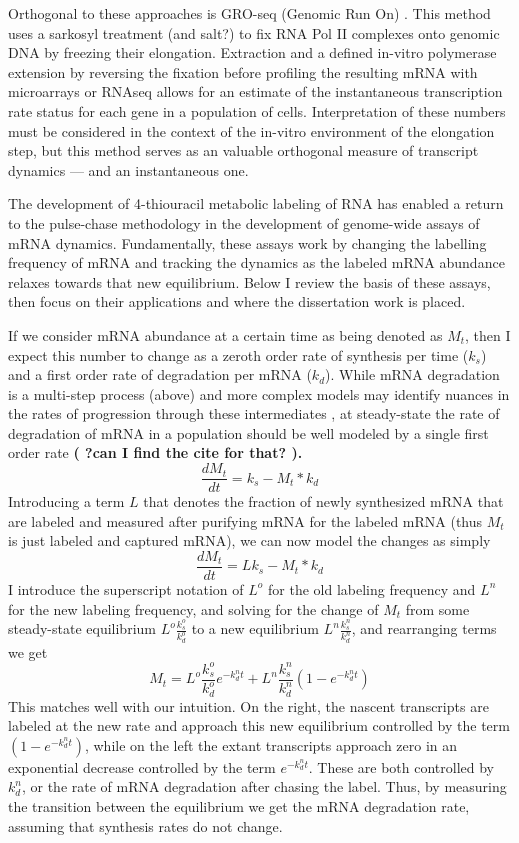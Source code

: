 Orthogonal to these approaches is GRO-seq
(Genomic Run On)
\parencite{garcia2004genomic}. This method uses a sarkosyl treatment (and
salt?) to fix RNA Pol II complexes onto genomic DNA by freezing
their elongation. Extraction and a defined in-vitro polymerase
extension by reversing the fixation before profiling the resulting
mRNA with microarrays or RNAseq allows for an estimate of the
instantaneous transcription rate status for each gene in a population
of cells. Interpretation of these numbers must be considered in the
context of the in-vitro environment of the elongation step, but this
method serves as an valuable orthogonal measure of transcript dynamics
--- and an instantaneous one.  

The development of 4-thiouracil
metabolic labeling of RNA 
\parencite{dolken2008high}
has enabled a return to
the pulse-chase methodology in the development of genome-wide assays
of mRNA dynamics. Fundamentally, these assays work by changing the
labelling frequency of mRNA and tracking the dynamics as the labeled
mRNA abundance relaxes towards that new equilibrium. Below I review
the basis of these assays, then focus on their applications and where
the dissertation work is placed.  

If we consider mRNA abundance at a
certain time as being denoted as $M_t$, then I expect this number to
change as a zeroth order rate of synthesis per time ($k_s$) and a
first order rate of degradation per mRNA ($k_d$). While mRNA
degradation is a multi-step process (above) and more complex models
may identify nuances in the rates of progression through these
intermediates \parencite{deneke2013complex}, at steady-state the rate of
degradation of mRNA in a population should be well modeled by a single
first order rate 
\textbf{( ?can I find the cite for that? ).}
$$\frac{dM_t}{dt} = k_s - M_t*k_d$$ Introducing a term $L$ that
denotes the fraction of newly synthesized mRNA that are labeled and
measured after purifying mRNA for the labeled mRNA (thus $M_t$ is just
labeled and captured mRNA), we can now model the changes as simply
$$\frac{dM_t}{dt} = L k_s - M_t*k_d$$ I introduce the superscript
notation of $L^o$ for the old labeling frequency and $L^n$ for the new
labeling frequency, and solving for the change of $M_t$ from some
steady-state equilibrium $L^o \frac{k_s^o}{k_d^o}$ to a new
equilibrium $L^n \frac{k_s^n}{k_d^n}$, and rearranging terms we get
$$M_t =  L^o \frac{k_s^o}{k_d^o} e^{-k_d^n t} + L^n \frac{k_s^n}{k_d^n} ( 1- e^{-k_d^n t} )$$ 
This matches well with our
intuition. On the right, the nascent transcripts are labeled at the
new rate and approach this new equilibrium controlled by the term $(
1- e^{-k_d^n t} )$, while on the left the extant transcripts approach
zero in an exponential decrease controlled by the term $e^{-k_d^n t}$.
These are both controlled by $k_d^n$, or the rate of mRNA degradation
after chasing the label. Thus, by measuring the transition between the
equilibrium we get the mRNA degradation rate, assuming that synthesis
rates do not change.  

